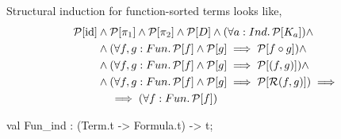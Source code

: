 \begin{node}
Structural induction for function-sorted terms looks like,
\begin{equation*}
\begin{split}
\mathcal{P}[\operatorname{id}]&\land\mathcal{P}[\pi_{1}]\land\mathcal{P}[\pi_{2}]\land\mathcal{P}[D]\land(\forall a:Ind\ldotp\mathcal{P}[K_{a}])\land\\
&\land(\forall f,g:Fun\ldotp\mathcal{P}[f]\land\mathcal{P}[g]\implies\mathcal{P}[f\circ g])\land\\
&\land(\forall f,g:Fun\ldotp\mathcal{P}[f]\land\mathcal{P}[g]\implies\mathcal{P}[(f,g)])\land\\
&\land(\forall f,g:Fun\ldotp\mathcal{P}[f]\land\mathcal{P}[g]\implies\mathcal{P}[\mathcal{R}(f,g)])\implies\\
&\quad\implies(\forall f:Fun\ldotp\mathcal{P}[f])
\end{split}
\end{equation*}
\end{node}

\nwenddocs{}\plusendmoddef\nwstartdeflinemarkup{}\nwenddeflinemarkup
val Fun_ind : (Term.t -> Formula.t) -> t;
\nwendcode{}\nwdocspar

